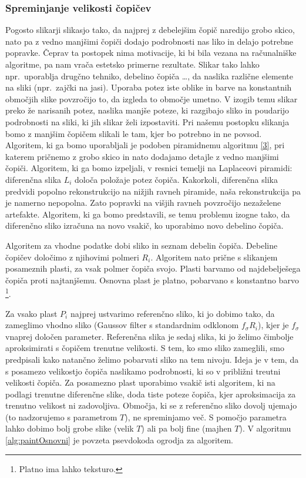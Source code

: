 \subsubsection{Spreminjanje velikosti čopičev}
Pogosto slikarji slikasjo tako, da najprej z debelejšim čopič naredijo grobo skico, nato pa z vedno manjšimi čopiči dodajo podrobnosti nas liko in delajo potrebne popravke. Čeprav ta postopek nima motivacije, ki bi bila vezana na računalniške algoritme, pa nam vrača estetsko primerne rezultate. Slikar tako lahko npr.\ uporablja drugčno tehniko, debelino čopiča \ldots, da naslika različne elemente na sliki (npr.\ zajčki na jasi). Uporaba potez iste oblike in barve na konstantnih območjih slike povzročijo to, da izgleda to območje umetno. V izogib temu slikar preko že narisanih potez, naslika manjše poteze, ki razgibajo sliko in poudarijo podrobnosti na sliki, ki jih slikar želi izpostaviti. Pri našemu postopku slikanja bomo z manjšim čopičem slikali le tam, kjer bo potrebno in ne povsod. Algoritem, ki ga bomo uporabljali je podoben piramidnemu algoritmu \ref{3}, pri katerem pričnemo z grobo skico in nato dodajamo detajle z vedno manjšimi čopiči. Algoritem, ki ga bomo izpeljali, v resnici temelji na Laplaceovi piramidi: diferenčna slika $L_i$ določa položaje potez čopiča. Kakorkoli, diferenčna slika predvidi popolno rekonstrukcijo na nižjih ravneh piramide, naša rekonstrukcija pa je namerno nepopolna. Zato popravki na višjih ravneh povzročijo nezaželene artefakte. Algoritem, ki ga bomo predstavili, se temu problemu izogne tako, da diferenčno sliko izračuna na novo vsakič, ko uporabimo novo debelino čopiča.

Algoritem za vhodne podatke dobi sliko in seznam debelin čopiča. Debeline čopičev določimo z njihovimi polmeri $R_i$. Algoritem nato prične s slikanjem posameznih plasti, za vsak polmer čopiča svojo. Plasti barvamo od najdebelješega čopiča proti najtanjšemu. Osnovna plast je platno, pobarvano s konstantno barvo \footnote{Platno ima lahko teksturo.}.

Za vsako plast $P_i$ najprej ustvarimo referenčno sliko, ki jo dobimo tako, da zameglimo vhodno sliko (Gaussov filter s standardnim odklonom $f_{\sigma} R_i$), kjer je $f_{\sigma}$ vnaprej določen parameter. Referenčna slika je sedaj slika, ki jo želimo čimbolje aproksimirati s čopičem trenutne velikosti. S tem, ko smo sliko zameglili, smo predpisali kako natančno želimo pobarvati sliko na tem nivoju. Ideja je v tem, da s posamezo velikostjo čopiča naslikamo podrobnosti, ki so v približni treutni velikosti čopiča. Za posamezno plast uporabimo vsakič isti algoritem, ki na podlagi trenutne diferenčne slike, doda tiste poteze čopiča, kjer aproksimacija za trenutno velikost ni zadovoljiva. Območja, ki se z referenčno sliko dovolj ujemajo (to nadzorujemo s parametrom $T$), ne spreminjamo več. S pomočjo parametra lahko dobimo bolj grobe slike (velik $T$) ali pa bolj fine (majhen $T$). V algoritmu \ref{alg:paintOsnovni} je povzeta psevdokoda ogrodja za algoritem.

